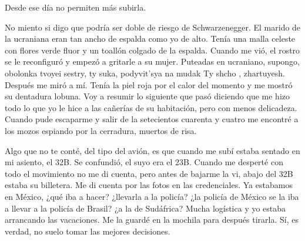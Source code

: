 \documentclass[12pt,twoside,openright,a5paper]{book}
\begin{document}
Desde ese día no permiten más subirla.

\afterpage{}
\vspace{0.5cm}
\hrulefill\hspace{0.2cm} \decofourleft\decofourright \hspace{0.2cm} \hrulefill
\vspace{0.5cm}

No miento si digo que podría ser doble de riesgo de Schwarzenegger. El
marido de la ucraniana eran tan ancho de espalda como yo de alto. Tenía
una malla celeste con flores verde fluor y un toallón colgado de la
espalda. Cuando me vió, el rostro se le reconfiguró y empezó a gritarle a
su mujer. Puteadas en ucraniano, supongo, obolonka tvoyei sestry, ty suka,
podyvit'sya na mudak Ty shcho , zhartuyesh. Después me miró a mí. Tenía
la piel roja por el calor del momento y me mostró su dentadura lobuna. Voy
a resumir lo siguiente que pasó diciendo que me hizo todo lo que yo le
hice a las cañerías de su habitación, pero con menos delicadeza. Cuando
pude escaparme y salir de la setecientos cuarenta y cuatro me encontré a
los mozos espiando por la cerradura, muertos de risa.


\vspace{0.5cm}
\hrulefill\hspace{0.2cm} \decofourleft\decofourright \hspace{0.2cm} \hrulefill
\vspace{0.5cm}

Algo que no te conté, del tipo del avión, es que cuando me subí estaba
sentado en mi asiento, el 32B. Se confundió, el suyo era el 23B. Cuando
me desperté con todo el movimiento no me di cuenta, pero antes de bajarme
la vi, abajo del 32B estaba su billetera. Me di cuenta por las fotos en
las credenciales. Ya estabamos en México, ¿qué iba a hacer? ¿llevarla
a la policía? ¿la policía de México se la iba a llevar a la policía
de Brasil? ¿a la de Sudáfrica? Mucha logística y yo estaba arrancando
las vacaciones. Me la guardé en la mochila para después tirarla. Sí,
es verdad, no suelo tomar las mejores decisiones.


\vspace{0.5cm}
\hrulefill\hspace{0.2cm} \decofourleft\decofourright \hspace{0.2cm} \hrulefill
\vspace{0.5cm}
\end{document}
